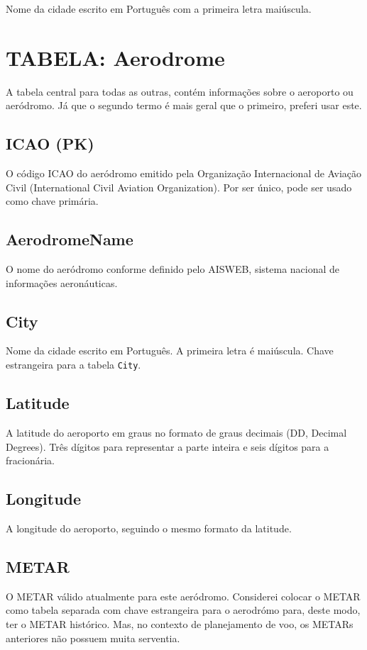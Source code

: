 Nome da cidade escrito em Português com a primeira letra maiúscula.


\section{TABELA: Aerodrome}

A tabela central para todas as outras, contém informações sobre o aeroporto ou aeródromo. 
Já que o segundo termo é mais geral que o primeiro, preferi usar este.

\subsection{ICAO (PK)}
O código ICAO do aeródromo emitido pela Organização Internacional de Aviação Civil 
(International Civil Aviation Organization). Por ser único, pode ser usado como chave primária.

\subsection{AerodromeName}
O nome do aeródromo conforme definido pelo AISWEB, sistema nacional de informações aeronáuticas.

\subsection{City}
Nome da cidade escrito em Português. A primeira letra é maiúscula.
Chave estrangeira para a tabela \texttt{City}.

\subsection{Latitude}
A latitude do aeroporto em graus no formato de graus decimais (DD, Decimal Degrees). Três dígitos 
para representar a parte inteira e seis dígitos para a fracionária.

\subsection{Longitude}
A longitude do aeroporto, seguindo o mesmo formato da latitude.

\subsection{METAR}
O METAR válido atualmente para este aeródromo. Considerei colocar o METAR como tabela separada
com chave estrangeira para o aerodrómo para, deste modo, ter o METAR histórico. Mas, no 
contexto de planejamento de voo, os METARs anteriores não possuem muita serventia.

